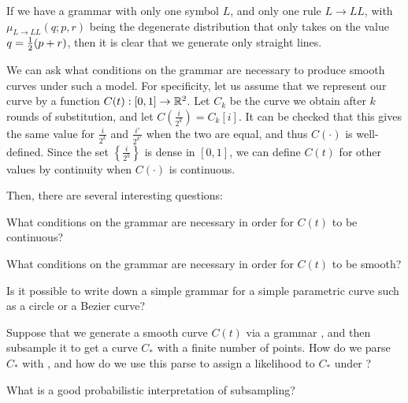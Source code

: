 If we have a grammar with only one symbol $L$, and only one rule $L\to
LL$, with $\mu_{L\to LL}(q;p,r)$ being the degenerate distribution
that only takes on the value $q=\frac{1}{2}(p+r)$, then it is clear that we
generate only straight lines.

We can ask what conditions on the grammar are necessary to produce
smooth curves under such a model. For specificity, let us assume that
we represent our curve by a function $C(t) : [0,1] \to \mathbb{R}^2$. Let
$C_k$ be the curve we obtain after $k$ rounds of substitution, and let
$C(\frac{i}{2^k}) = C_k[i]$. It can be checked that this gives the
same value for $\frac{i}{2^k}$ and $\frac{i'}{2^{k'}}$ when the two
are equal, and thus $C(\cdot)$ is well-defined.  Since the set
$\left\{\frac{i}{2^k}\right\}$ is dense in $[0,1]$, we can define
$C(t)$ for other values by continuity when $C(\cdot)$ is continuous.

Then, there are several interesting questions:

\begin{q}
What conditions on the grammar are necessary in order for $C(t)$ to
be continuous?
\end{q}

\begin{q}
What conditions on the grammar are necessary in order for $C(t)$ to
be smooth?
\end{q}

\begin{q}
Is it possible to write down a simple grammar for a simple parametric
curve such as a circle or a Bezier curve?
\end{q}

\begin{q}
Suppose that we generate a smooth curve $C(t)$ via a grammar \GGG, and
then subsample it to get a curve $C_*$ with a finite number of
points. How do we parse $C_*$ with \GGG, and how do we use this parse
to assign a likelihood to $C_*$ under \GGG?
\end{q}

\begin{q}
What is a good probabilistic interpretation of subsampling?
\end{q}

